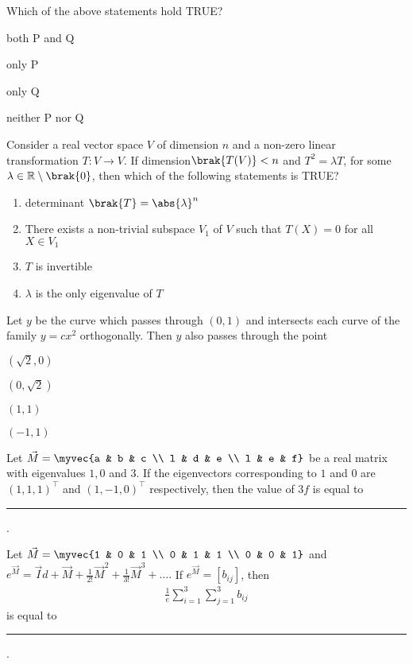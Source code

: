 Which of the above statements hold TRUE?
\hfill{}
\begin{enumerate}
\begin{multicols}{4}
\item both P and Q
\item only P
\item only Q
\item neither P nor Q
\end{multicols}
\end{enumerate}
\item Consider a real vector space $V$ of dimension $n$ and a non-zero linear transformation $T : V \to V$. If dimension$\brak{T(V)} < n$ and $T^2 = \lambda T$, for some $\lambda \in \mathbb{R} \setminus \brak{0}$, then which of the following statements is TRUE?
\hfill{}
\begin{enumerate}
\item determinant $\brak{T} = \abs{\lambda}^n$
\item There exists a non-trivial subspace $V_1$ of $V$ such that $T(X) = 0$ for all $X \in V_1$
\item $T$ is invertible
\item $\lambda$ is the only eigenvalue of $T$
\end{enumerate}
\item Let $y$ be the curve which passes through $(0,1)$ and intersects each curve of the family $y = c x^2$ orthogonally. Then $y$ also passes through the point
\hfill{}
\begin{enumerate}
\begin{multicols}{4}
\item $(\sqrt{2}, 0)$
\item $(0, \sqrt{2})$
\item $(1, 1)$
\item $(-1, 1)$
\end{multicols}
\end{enumerate}
\item Let $\vec{M} = \myvec{a & b & c \\ l & d & e \\ l & e & f}$ be a real matrix with eigenvalues $1, 0$ and $3$. If the eigenvectors corresponding to $1$ and $0$ are $(1, 1, 1)^{\top}$ and $(1, -1, 0)^{\top}$ respectively, then the value of $3f$ is equal to 
\rule{1cm}{0.01pt}.
\hfill{}
\item Let $\vec{M} = \myvec{1 & 0 & 1 \\ 0 & 1 & 1 \\ 0 & 0 & 1}$ and $e^\vec{M} = \vec{I}d + \vec{M} + \frac{1}{2!}\vec{M}^2 + \frac{1}{3!}\vec{M}^3 + \dots.$ If $e^\vec{M} = [b_{ij}]$, then
\begin{align*}
\frac{1}{e} \sum_{i=1}^3 \sum_{j=1}^3 b_{ij}
\end{align*}
is equal to \rule{1cm}{0.01pt}.
\hfill{}
